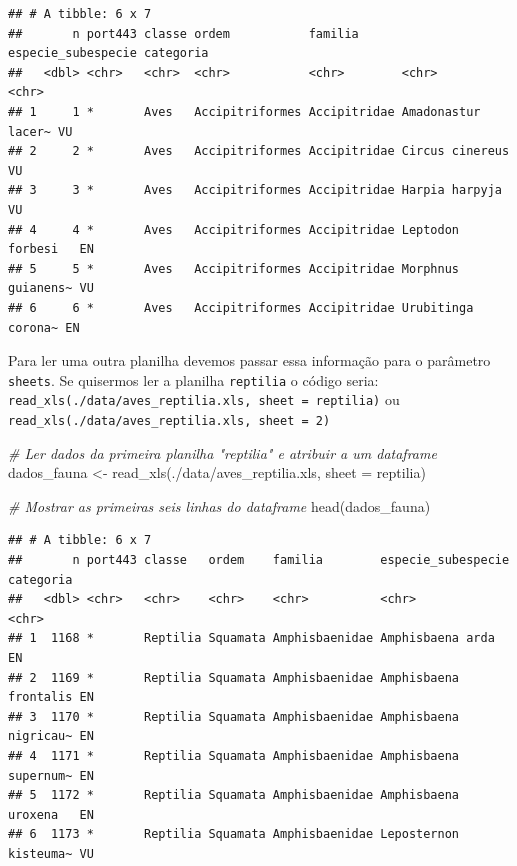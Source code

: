 \documentclass[
]{article}
\newenvironment{Shaded}{\begin{snugshade}}{\end{snugshade}}
\newcommand{\AttributeTok}[1]{\textcolor[rgb]{0.77,0.63,0.00}{#1}}
\newcommand{\CommentTok}[1]{\textcolor[rgb]{0.56,0.35,0.01}{\textit{#1}}}
\newcommand{\FunctionTok}[1]{\textcolor[rgb]{0.00,0.00,0.00}{#1}}
\newcommand{\NormalTok}[1]{#1}
\newcommand{\OtherTok}[1]{\textcolor[rgb]{0.56,0.35,0.01}{#1}}
\newcommand{\StringTok}[1]{\textcolor[rgb]{0.31,0.60,0.02}{#1}}
\begin{document}
\begin{verbatim}
## # A tibble: 6 x 7
##       n port443 classe ordem           familia      especie_subespecie categoria
##   <dbl> <chr>   <chr>  <chr>           <chr>        <chr>              <chr>    
## 1     1 *       Aves   Accipitriformes Accipitridae Amadonastur lacer~ VU       
## 2     2 *       Aves   Accipitriformes Accipitridae Circus cinereus    VU       
## 3     3 *       Aves   Accipitriformes Accipitridae Harpia harpyja     VU       
## 4     4 *       Aves   Accipitriformes Accipitridae Leptodon forbesi   EN       
## 5     5 *       Aves   Accipitriformes Accipitridae Morphnus guianens~ VU       
## 6     6 *       Aves   Accipitriformes Accipitridae Urubitinga corona~ EN
\end{verbatim}

Para ler uma outra planilha devemos passar essa informação para o
parâmetro \texttt{sheets}. Se quisermos ler a planilha \texttt{reptilia}
o código seria:
\texttt{read\_xls(\textquotesingle{}./data/aves\_reptilia.xls\textquotesingle{},\ sheet\ =\ \textquotesingle{}reptilia\textquotesingle{})}
ou
\texttt{read\_xls(\textquotesingle{}./data/aves\_reptilia.xls\textquotesingle{},\ sheet\ =\ 2)}

\begin{Shaded}
\begin{Highlighting}[]
\CommentTok{\# Ler dados da primeira planilha "reptilia" e atribuir a um dataframe}
\NormalTok{dados\_fauna }\OtherTok{\textless{}{-}} \FunctionTok{read\_xls}\NormalTok{(}\StringTok{\textquotesingle{}./data/aves\_reptilia.xls\textquotesingle{}}\NormalTok{, }\AttributeTok{sheet =} \StringTok{\textquotesingle{}reptilia\textquotesingle{}}\NormalTok{)}

\CommentTok{\# Mostrar as primeiras seis linhas do dataframe}
\FunctionTok{head}\NormalTok{(dados\_fauna)}
\end{Highlighting}
\end{Shaded}

\begin{verbatim}
## # A tibble: 6 x 7
##       n port443 classe   ordem    familia        especie_subespecie    categoria
##   <dbl> <chr>   <chr>    <chr>    <chr>          <chr>                 <chr>    
## 1  1168 *       Reptilia Squamata Amphisbaenidae Amphisbaena arda      EN       
## 2  1169 *       Reptilia Squamata Amphisbaenidae Amphisbaena frontalis EN       
## 3  1170 *       Reptilia Squamata Amphisbaenidae Amphisbaena nigricau~ EN       
## 4  1171 *       Reptilia Squamata Amphisbaenidae Amphisbaena supernum~ EN       
## 5  1172 *       Reptilia Squamata Amphisbaenidae Amphisbaena uroxena   EN       
## 6  1173 *       Reptilia Squamata Amphisbaenidae Leposternon kisteuma~ VU
\end{verbatim}
\end{document}
